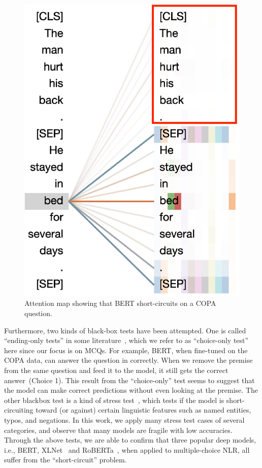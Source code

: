 \begin{figure}[th!]
\centering
\includegraphics[width=0.35\columnwidth]{figure/end_related.eps}
\caption{Attention map showing that BERT short-circuits on a COPA question.}
\label{fig:att-goodex}
\end{figure}

Furthermore, two kinds of black-box tests have been attempted.
One is called ``ending-only tests'' in some literature~\cite{endingonly1,endingonly2}, 
which we refer to as ``choice-only test'' here since 
our focus is on MCQs.
For example, BERT, when fine-tuned on the COPA data, can answer
the question in  correctly. When we remove the premise from 
the same question and feed it to the model, it still
gets the correct answer~(Choice 1). This result from the ``choice-only'' 
test seems to suggest that the model can make correct predictions
without even looking at the premise. 
The other blackbox test is a kind of stress test~\cite{checklist2020acl}, 
which tests if the model is short-circuiting toward (or against) certain linguistic features
such as named entities, typos, and negations.
In this work, we apply many stress test cases of several categories, 
and observe that many models are fragile with low accuracies.
Through the above tests, we are able to confirm that three popular 
deep models, i.e., BERT, XLNet~\cite{xlnet2019nips} and 
RoBERTa~\cite{roberta2019}, when applied to multiple-choice NLR, 
all suffer from the ``short-circuit'' problem.



